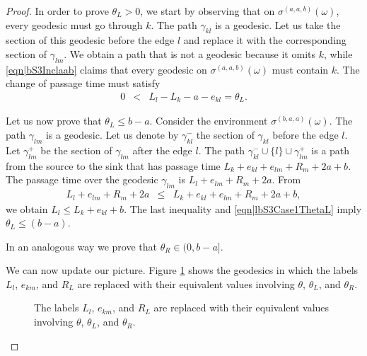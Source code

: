 \documentclass[10pt,a4paper]{amsart}
\begin{document}
\begin{proof}
In order to prove
$\theta_L>0$, we start by observing that on $\sigma^{(a,a,b)}(\omega)$, every geodesic must go through $k$. The path $\gamma_{kl}$ is a geodesic. 
Let us take the section of this geodesic before the edge $l$ and replace it with the corresponding section of $\gamma_{lm}$.
We obtain a path that is not a geodesic because it omits $k$, while \eqref{eqn|bS3Inclaab} claims that every geodesic on $\sigma^{(a,a,b)}(\omega)$ must contain $k$. The change of passage time must satisfy \begin{eqnarray}0&<&L_l-L_k-a-e_{kl}= \theta_L. \label{eqn|equivalentIneqThetaL}\end{eqnarray}
 

Let us now prove that $\theta_L\leq b-a$. Consider the environment $\sigma^{(b,a,a)}(\omega)$. The path $\gamma_{lm}$ is a geodesic. Let us denote by $\gamma_{kl}^-$ the section of $\gamma_{kl}$ before the edge $l$. Let $\gamma_{lm}^+$ be the section of $\gamma_{lm}$ after the edge $l$. The path $\gamma_{kl}^-\cup\{l\}\cup \gamma_{lm}^+$ is a path from the source to the sink that has passage time $L_k+e_{kl}+e_{lm}+R_m+2a+b$. 
The passage time over the geodesic $\gamma_{lm}$ is 
$L_l+e_{lm}+R_m+2a$. From 
\begin{eqnarray*}L_l+e_{lm}+R_m+2a&\leq &L_k+e_{kl}+e_{lm}+R_m+2a+b,
\end{eqnarray*}
we obtain  $L_l  \leq L_k+e_{kl} +  b$. The last inequality and  \eqref{eqn|lbS3Case1ThetaL} imply $\theta_L\leq (b-a)$.
 
In an analogous way we prove that $\theta_R\in (0,b-a]$. 

We can now update our picture. Figure \ref{fig|lowerBound3TriangleNoAlLRAUpdated} shows the geodesics in which the labels $L_l$, $e_{km}$, and $R_L$ are replaced with their equivalent values involving $\theta$, $\theta_L$, and $\theta_R$.

 \begin{figure}[t]
 \centering
{}
\caption{The labels $L_l$, $e_{km}$, and $R_L$ are replaced with their equivalent values involving $\theta$, $\theta_L$, and $\theta_R$.}
\label{fig|lowerBound3TriangleNoAlLRAUpdated}
\end{figure}


\end{proof}
\end{document}

